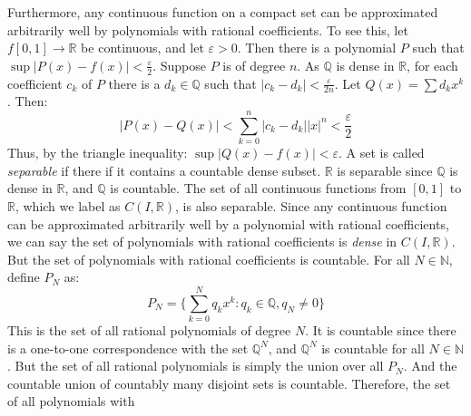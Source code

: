 \documentclass[crop=false,class=book,oneside]{standalone}
\begin{document}
            Furthermore, any continuous function on a compact
            set can be approximated arbitrarily well by
            polynomials with rational coefficients. To see this,
            let $f[0,1]\rightarrow\mathbb{R}$ be continuous,
            and let $\varepsilon>0$. Then there is a
            polynomial $P$ such that
            $\sup|P(x)-f(x)|<\frac{\varepsilon}{2}$.
            Suppose $P$ is of degree $n$.
            As $\mathbb{Q}$ is dense
            in $\mathbb{R}$, for each coefficient
            $c_{k}$ of $P$ there is a $d_{k}\in\mathbb{Q}$
            such that
            $|c_{k}-d_{k}|<\frac{\varepsilon}{2n}$.
            Let $Q(x)=\sum{d_{k}x^{k}}$. Then:
            \begin{equation*}
                    |P(x)-Q(x)|<
                    \sum_{k=0}^{n}|c_{k}-d_{k}||x|^{n}
                    <\frac{\varepsilon}{2}
                \end{equation*}
            Thus, by the triangle inequality:
            $\sup|Q(x)-f(x)|<\varepsilon$. A set is called
            \textit{separable} if there if it
            contains a countable dense subset. $\mathbb{R}$
            is separable since $\mathbb{Q}$ is dense in
            $\mathbb{R}$, and $\mathbb{Q}$ is countable.
            The set of all continuous functions from
            $[0,1]$ to $\mathbb{R}$, which we label as
            $C(I,\mathbb{R})$, is also separable.
            Since any continuous function can be approximated
            arbitrarily well by a polynomial with rational
            coefficients, we can say the set of polynomials
            with rational coefficients is \textit{dense} in
            $C(I,\mathbb{R})$. But the set of polynomials with
            rational coefficients is countable. For all
            $N\in\mathbb{N}$, define $P_{N}$ as:
            \begin{equation*}
                    P_{N}=\Big\{\sum_{k=0}^{N}
                    q_{k}x^{k}:q_{k}\in\mathbb{Q},
                    q_{N}\ne{0}\Big\}
                \end{equation*}
            This is the set of all rational polynomials
            of degree $N$. It is countable since there is
            a one-to-one correspondence with
            the set $\mathbb{Q}^{N}$, and $\mathbb{Q}^{N}$
            is countable for all $N\in\mathbb{N}$. But the
            set of all rational polynomials is simply the
            union over all $P_{N}$. And the countable union
            of countably many disjoint sets is countable.
            Therefore, the set of all polynomials with
\end{document}
